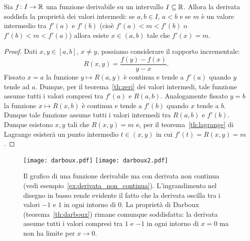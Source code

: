 \begin{theorem}
  \label{th:darboux}%
  Sia $f\colon I \to \mathbb R$ una funzione derivabile su un intervallo $I\subseteq \mathbb R$.
  Allora la derivata soddisfa la proprietà dei valori intermedi:
  se $a,b\in I$, $a<b$ e se $m$ è un valore intermedio tra 
  $f'(a)$ e $f'(b)$ (cioè $f'(a) < m < f'(b)$ o $f'(b) < m < f'(a)$)
  allora esiste $x\in(a,b)$ tale che $f'(x) = m$. 
\end{theorem}
\begin{proof}
Dati $x,y\in [a,b]$, $x\neq y$, possiamo considerare 
il rapporto incrementale:
  \[
    R(x,y) = \frac{f(y)-f(x)}{y-x}.
  \]
Fissato $x=a$ la funzione $y\mapsto R(a,y)$ è continua e tende a $f'(a)$
quando $y$ tende ad $a$.
Dunque, per il teorema~\ref{th:zeri} dei valori intermedi,
tale funzione assume tutti i valori compresi tra $f'(a)$ e 
$R(a,b)$. Analogamente fissato $y=b$ la funzione $x\mapsto R(x,b)$ 
è continua e tende a $f'(b)$ quando $x$ tende a $b$.
Dunque tale funzione assume tutti i valori intermedi 
tra $R(a,b)$ e $f'(b)$. 
Dunque esistono $x,y$ tali 
che $R(x,y)=m$ e, per il teorema~\ref{th:lagrange}
di Lagrange
esisterà un punto intermedio $t\in(x,y)$ in cui 
$f'(t)=R(x,y) = m$.
\end{proof}

\begin{figure}
  \centering\texttt{[image: darboux.pdf]}
  \centering\texttt{[image: darboux2.pdf]}

  \caption{Il grafico di una funzione derivabile ma con 
    derivata non continua (vedi esempio~\ref{ex:derivata_non_continua}).
    L'ingrandimento nel disegno in basso rende evidente 
    il fatto che la derivata oscilla tra i valori 
    $-1$ e $1$ in ogni intorno di $0$.
    La proprietà di Darboux (teorema~\ref{th:darboux})
    rimane comunque soddisfatta: la derivata assume tutti i valori 
    compresi tra $1$ e $-1$ in ogni intorno di $x=0$ ma 
    non ha limite per $x\to 0$.
}
\end{figure}

